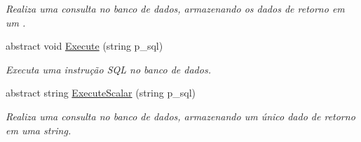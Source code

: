 \begin{DoxyCompactItemize}
\begin{DoxyCompactList}\small\item\em Realiza uma consulta no banco de dados, armazenando os dados de retorno em um . \end{DoxyCompactList}\item 
abstract void \hyperlink{classSpartacus_1_1Database_1_1Generic_a28f1c8821906653eb4ff1484de893d16}{Execute} (string p\+\_\+sql)
\begin{DoxyCompactList}\small\item\em Executa uma instrução S\+Q\+L no banco de dados. \end{DoxyCompactList}\item 
abstract string \hyperlink{classSpartacus_1_1Database_1_1Generic_a983620fd71f520deb71ae55304b98bf6}{Execute\+Scalar} (string p\+\_\+sql)
\begin{DoxyCompactList}\small\item\em Realiza uma consulta no banco de dados, armazenando um único dado de retorno em uma string. \end{DoxyCompactList}\end{DoxyCompactItemize}
